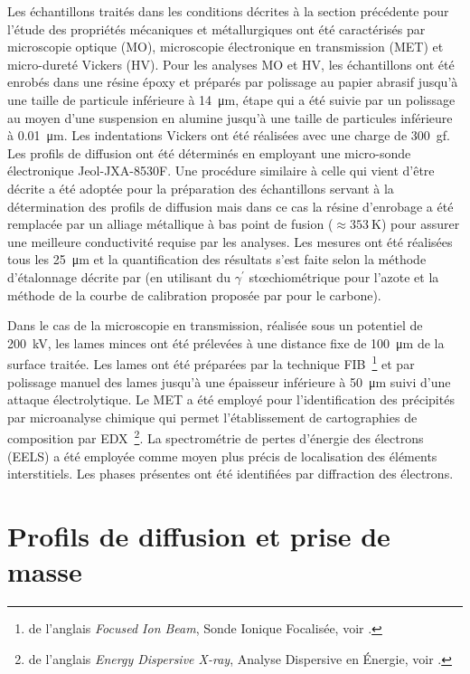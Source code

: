 Les échantillons traités dans les conditions décrites à la section précédente pour l'étude des propriétés mécaniques et métallurgiques ont été caractérisés par microscopie optique (MO), microscopie électronique en transmission (MET) et micro-dureté Vickers (HV). Pour les analyses MO et HV, les échantillons ont été enrobés dans une résine époxy et préparés par polissage au papier abrasif jusqu'à une taille de particule inférieure à \SI{14}{\micro\metre}, étape qui a été suivie par un polissage au moyen d'une suspension en alumine jusqu'à une taille de particules inférieure à \SI{0,01}{\micro\metre}. Les indentations Vickers ont été réalisées avec une charge de \SI{300}{gf}. Les profils de diffusion ont été déterminés en employant une micro-sonde électronique Jeol-JXA-8530F. Une procédure similaire à celle qui vient d'être décrite a été adoptée pour la préparation des échantillons servant à la détermination des profils de diffusion mais dans ce cas la résine d'enrobage a été remplacée par un alliage métallique à bas point de fusion ($\approx\SI{353}{\kelvin}$) pour assurer une meilleure conductivité requise par les analyses. Les mesures ont été réalisées tous les \SI{25}{\micro\metre} et la quantification des résultats s'est faite selon la méthode d'étalonnage décrite par \citet{Catteau2014} (en utilisant du $\gamma^{\prime}$ st{\oe}chiométrique pour l'azote et la méthode de la courbe de calibration proposée par \cite{Robaut2006} pour le carbone).

Dans le cas de la microscopie en transmission, réalisée sous un potentiel de \SI{200}{\kilo\volt}, les lames minces ont été prélevées à une distance fixe de \SI{100}{\micro\metre} de la surface traitée. Les lames ont été préparées par la technique FIB~\footnote{de l'anglais \textit{Focused Ion Beam}, Sonde Ionique Focalisée, voir \citet{Williams2009}.} et par polissage manuel des lames jusqu'à une épaisseur inférieure à \SI{50}{\micro\metre} suivi d'une attaque électrolytique. Le MET a été employé pour l'identification des précipités par microanalyse chimique qui permet l'établissement de cartographies de composition par EDX~\footnote{de l'anglais \textit{Energy Dispersive X-ray}, Analyse Dispersive en Énergie, voir \citet{Williams2009}.}. La spectrométrie de pertes d'énergie des électrons (EELS) a été employée comme moyen plus précis de localisation des éléments interstitiels. Les phases présentes ont été identifiées par diffraction des électrons.

\section{Profils de diffusion et prise de masse}
\label{sec:comparaison_procedes}

